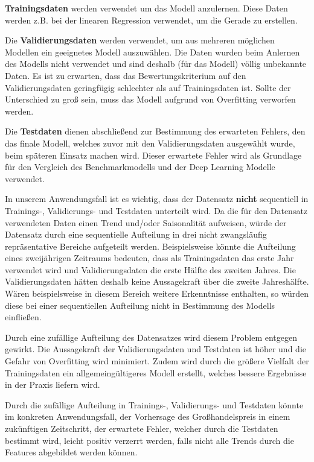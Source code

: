 \textbf{Trainingsdaten} werden verwendet um das Modell anzulernen. Diese Daten werden z.B. bei der linearen Regression verwendet, um die Gerade zu erstellen.

Die \textbf{Validierungsdaten} werden verwendet, um aus mehreren möglichen Modellen ein geeignetes Modell auszuwählen. Die Daten wurden beim Anlernen des Modells nicht verwendet und sind deshalb (für das Modell) völlig unbekannte Daten. Es ist zu erwarten, dass das Bewertungskriterium auf den Validierungsdaten geringfügig schlechter als auf Trainingsdaten ist. Sollte der Unterschied zu groß sein, muss das Modell aufgrund von Overfitting verworfen werden. 

Die \textbf{Testdaten} dienen abschließend zur Bestimmung des erwarteten Fehlers, den das finale Modell, welches zuvor mit den Validierungsdaten ausgewählt wurde, beim späteren Einsatz machen wird. Dieser erwartete Fehler wird als Grundlage für den Vergleich des Benchmarkmodells und der Deep Learning Modelle verwendet.

In unserem Anwendungsfall ist es wichtig, dass der Datensatz \textbf{nicht} sequentiell in Trainings-, Validierungs- und Testdaten unterteilt wird. Da die für den Datensatz verwendeten Daten einen Trend und/oder Saisonalität aufweisen, würde der Datensatz durch eine sequentielle Aufteilung in drei nicht zwangsläufig repräsentative Bereiche aufgeteilt werden. Beispielsweise könnte die Aufteilung eines zweijährigen Zeitraums bedeuten, dass als Trainingsdaten das erste Jahr verwendet wird und Validierungsdaten die erste Hälfte des zweiten Jahres. Die Validierungsdaten hätten deshalb keine Aussagekraft über die zweite Jahreshälfte. Wären beispielsweise in diesem Bereich weitere Erkenntnisse enthalten, so würden diese bei einer sequentiellen Aufteilung nicht in Bestimmung des Modells einfließen. 

Durch eine zufällige Aufteilung des Datensatzes wird diesem Problem entgegen gewirkt. Die Aussagekraft der Validierungsdaten und Testdaten ist höher und die Gefahr von Overfitting wird minimiert. Zudem wird durch die größere Vielfalt der Trainingsdaten ein allgemeingültigeres Modell erstellt, welches bessere Ergebnisse in der Praxis liefern wird.

Durch die zufällige Aufteilung in Trainings-, Validierungs- und Testdaten könnte im konkreten Anwendungsfall, der Vorhersage des Großhandelspreis in einem zukünftigen Zeitschritt, der erwartete Fehler, welcher durch die Testdaten bestimmt wird, leicht positiv verzerrt werden, falls nicht alle Trends durch die Features abgebildet werden können.

